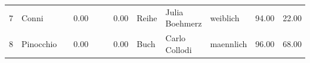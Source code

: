 \begin{table}
\begin{center}
{\begin{tabular}{rllrllrlllrr}
  7 & Conni                                                                                                                                                                                                                                                           &                                                                                                                                                                                                                                                                 & 0.00 &                                                                                                                                                                                                                                                                 &                                                                                                                                                                                                                                                                 & 0.00 & Reihe & Julia Boehmerz                                                                                                                                                                                                                                                  & weiblich & 94.00 & 22.00 \\ 
  8 & Pinocchio                                                                                                                                                                                                                                                       &                                                                                                                                                                                                                                                                 & 0.00 &                                                                                                                                                                                                                                                                 &                                                                                                                                                                                                                                                                 & 0.00 & Buch & Carlo Collodi                                                                                                                                                                                                                                                   & maennlich & 96.00 & 68.00 \\ 

\end{tabular}}
\end{center}
\end{table}

